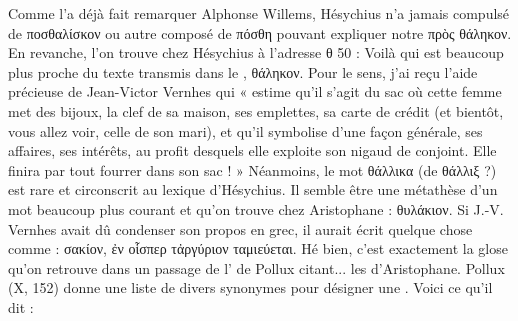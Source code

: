 {Comme l'a déjà fait remarquer Alphonse Willems, Hésychius n'a jamais compulsé de ποσθαλίσκον ou autre composé de πόσθη pouvant expliquer notre πρὸς θάληκον. 
En revanche, l'on trouve chez Hésychius à l'adresse θ 50 :
Voilà qui est beaucoup plus proche du texte transmis dans le , θάληκον. 
Pour le sens, j'ai reçu l'aide précieuse de Jean-Victor Vernhes qui « estime qu'il s'agit du sac où cette femme met des bijoux, la clef de sa maison, ses emplettes, sa carte de crédit (et bientôt, vous allez voir, celle de son mari), et qu'il symbolise d'une façon générale, ses affaires, ses intérêts, au profit desquels elle exploite son nigaud de conjoint. Elle finira par tout fourrer dans son sac ! »
Néanmoins, le mot θάλλικα (de θάλλιξ ?) est rare et circonscrit au lexique d'Hésychius. Il semble être une métathèse d'un mot beaucoup plus courant et qu'on trouve chez Aristophane : θυλάκιον. 
Si J.-V. Vernhes avait dû condenser son propos en grec, il aurait écrit quelque chose comme : σακίον, ἐν οἷσπερ τἀργύριον ταμιεύεται. Hé bien, c'est exactement la glose qu'on retrouve dans un passage de l' de Pollux citant... les  d'Aristophane.
Pollux (X, 152) donne une liste de divers synonymes pour désigner une . Voici ce qu'il dit :}
